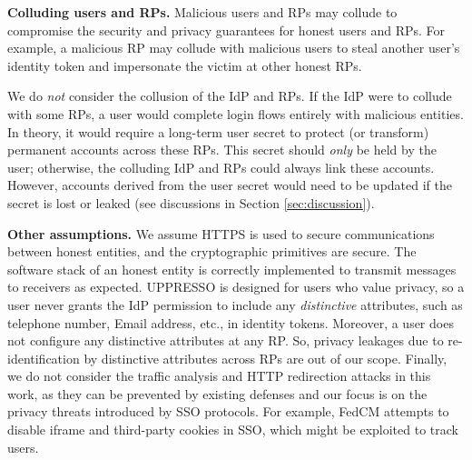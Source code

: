 \noindent \textbf{Colluding users and RPs.}
Malicious users and RPs may collude to compromise the security and privacy guarantees for honest users and RPs. For example, a malicious RP may collude with malicious users to steal another user's identity token and impersonate the victim at other honest RPs.

We do \emph{not} consider the collusion of the IdP and RPs. If the IdP were to collude with some RPs, a user would complete login flows entirely with malicious entities. In theory, it would require a long-term user secret to protect (or transform) permanent accounts across these RPs. This secret should \emph{only} be held  by the user; otherwise, the colluding IdP and RPs could always link these accounts.
However, accounts derived from the user secret would need to be updated if the secret is lost or leaked (see discussions in Section \ref{sec:discussion}).

\noindent \textbf{Other assumptions.}
We assume HTTPS is used to secure communications between honest entities, and the cryptographic primitives are secure. The software stack of an honest entity is correctly implemented to transmit messages to receivers as expected.
UPPRESSO is designed for users who value privacy,
so a user never grants the IdP permission to include any \emph{distinctive} attributes, such as telephone number, Email address, etc., in identity tokens. Moreover, a user does not configure any distinctive attributes at any RP. So, privacy leakages due to re-identification by distinctive attributes across RPs are out of our scope. Finally, we do not consider the traffic analysis and HTTP redirection attacks in this work, as they can be prevented by existing defenses and our focus is on the privacy threats introduced by SSO protocols.
For example,
 FedCM \cite{FedCM} attempts to disable iframe and third-party cookies in SSO, which might be exploited to track users.


